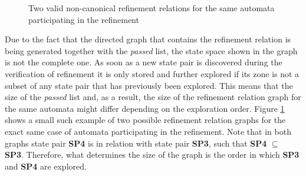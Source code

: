 \begin{figure}
\centering
{}%
\hspace{3cm}%
\caption{Two valid non-canonical refinement relations for the same automata participating in the refinement} \label{fig:ref-relation}
\end{figure}

Due to the fact that the directed graph that contains the refinement relation is being generated together with the \textit{passed} list, the state space shown in the graph is not the complete one. As soon as a new state pair is discovered during the verification of refinement it is only stored and further explored if its zone is not a subset of any state pair that has previously been explored. This means that the size of the \textit{passed} list and, as a result, the size of the refinement relation graph for the same automata might differ depending on the exploration order. Figure \ref{fig:ref-relation} shows a small such example of two possible refinement relation graphs for the exact same case of automata participating in the refinement. Note that in both graphs state pair \textbf{SP4} is in relation with state pair \textbf{SP3}, such that \textbf{SP4} $\subseteq$ \textbf{SP3}. Therefore, what determines the size of the graph is the order in which \textbf{SP3} and \textbf{SP4} are explored.

